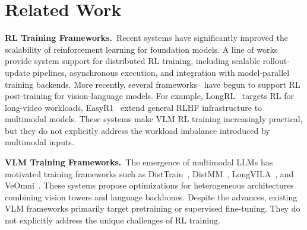 \section{Related Work}
\label{sec:related_work}

\noindent\textbf{RL Training Frameworks.}~Recent systems have significantly improved the scalability of reinforcement learning for foundation models. A line of works~\cite{verl,siiRL,areal,streamRL,miroRL,roll} provide system support for distributed RL training, including scalable rollout-update pipelines, asynchronous execution, and integration with model-parallel training backends. More recently, several frameworks~\cite{longrl,verl,slime,easyr1} have begun to support RL post-training for vision-language models. For example, LongRL~\cite{longrl} targets RL for long-video workloads, EasyR1~\cite{easyr1} extend general RLHF infrastructure to multimodal models. These systems make VLM RL training increasingly practical, but they do not explicitly address the workload imbalance introduced by multimodal inputs. %


\noindent\textbf{VLM Training Frameworks.}~The emergence of multimodal LLMs has motivated training frameworks such as DistTrain~\citep{DistTrain}, DistMM~\citep{DistMM}, LongVILA~\citep{LongVILA}, and VeOmni~\citep{veomni}. These systems propose optimizations for heterogeneous architectures combining vision towers and language backbones. Despite the advances, existing VLM frameworks primarily target pretraining or supervised fine-tuning. They do not explicitly address the unique challenges of RL training.

